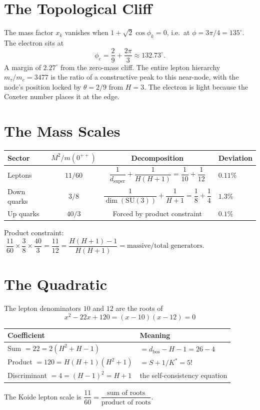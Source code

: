 \documentclass[11pt,a4paper]{article}
\theoremstyle{definition}
\theoremstyle{remark}
\newcommand{\SU}{\mathrm{SU}}
\begin{document}
\section*{The Topological Cliff}

The mass factor $x_k$ vanishes when $1 + \sqrt{2}\cos\phi_k = 0$, i.e.\ at $\phi = 3\pi/4 = 135^\circ$. The electron sits at
\[
\phi_e = \frac{2}{9} + \frac{2\pi}{3} \approx 132.73^\circ.
\]
A margin of $2.27^\circ$ from the zero-mass cliff. The entire lepton hierarchy $m_\tau/m_e = 3477$ is the ratio of a constructive peak to this near-node, with the node's position locked by $\theta = 2/9$ from $H = 3$. The electron is light because the Coxeter number places it at the edge.

\section*{The Mass Scales}

\begin{center}
\begin{tabular}{@{}lccl@{}}
\toprule
\textbf{Sector} & $M^2/m(0^{++})$ & \textbf{Decomposition} & \textbf{Deviation} \\
\midrule
Leptons & $11/60$ & $\dfrac{1}{d_\mathrm{super}} + \dfrac{1}{H(H\!+\!1)} = \dfrac{1}{10}+\dfrac{1}{12}$ & $0.11\%$ \\[8pt]
Down quarks & $3/8$ & $\dfrac{1}{\dim(\SU(3))} + \dfrac{1}{H\!+\!1} = \dfrac{1}{8}+\dfrac{1}{4}$ & $1.3\%$ \\[8pt]
Up quarks & $40/3$ & Forced by product constraint & $0.1\%$ \\[4pt]
\bottomrule
\end{tabular}
\end{center}

\smallskip
Product constraint: $\;\dfrac{11}{60}\times\dfrac{3}{8}\times\dfrac{40}{3} = \dfrac{11}{12} = \dfrac{H(H\!+\!1)-1}{H(H\!+\!1)} = \text{massive/total generators}.$

\section*{The Quadratic}

The lepton denominators $10$ and $12$ are the roots of
\begin{equation}\label{eq:quadratic}
\boxed{\;x^2 - 22x + 120 = (x-10)(x-12) = 0\;}
\end{equation}
\begin{center}
\begin{tabular}{@{}ll@{}}
\toprule
\textbf{Coefficient} & \textbf{Meaning} \\
\midrule
Sum $= 22 = 2(H^2\!+\!H\!-\!1)$ & $= d_\mathrm{bos} - H - 1 = 26 - 4$ \\
Product $= 120 = H(H\!+\!1)(H^2\!+\!1) $ & $= S + 1/K^* = 5!$ \\
Discriminant $= 4 = (H\!-\!1)^2 = H\!+\!1$ & the self-consistency equation \\
\bottomrule
\end{tabular}
\end{center}
The Koide lepton scale is $\dfrac{11}{60} = \dfrac{\text{sum of roots}}{\text{product of roots}}$.
\end{document}
